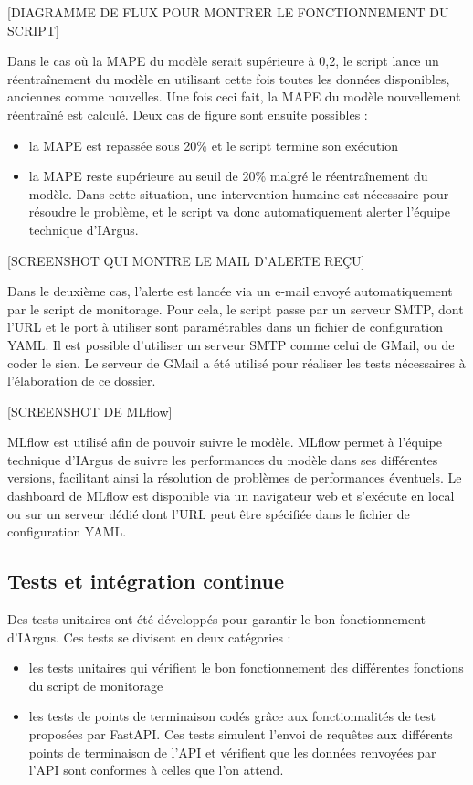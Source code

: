 \documentclass[french]{article}
\begin{document}
    [DIAGRAMME DE FLUX POUR MONTRER LE FONCTIONNEMENT DU SCRIPT]

    Dans le cas où la MAPE du modèle serait supérieure à 0,2, le script lance un réentraînement du modèle en utilisant cette fois toutes les données disponibles, anciennes comme nouvelles. Une fois ceci fait, la MAPE du modèle nouvellement réentraîné est calculé. Deux cas de figure sont ensuite possibles :
    \begin{itemize}
        \item la MAPE est repassée sous 20\% et le script termine son exécution
        \item la MAPE reste supérieure au seuil de 20\% malgré le réentraînement du modèle. Dans cette situation, une intervention humaine est nécessaire pour résoudre le problème, et le script va donc automatiquement alerter l'équipe technique d'IArgus.
    \end{itemize}

    [SCREENSHOT QUI MONTRE LE MAIL D'ALERTE REÇU]

    Dans le deuxième cas, l'alerte est lancée via un e-mail envoyé automatiquement par le script de monitorage. Pour cela, le script passe par un serveur SMTP, dont l'URL et le port à utiliser sont paramétrables dans un fichier de configuration YAML. Il est possible d'utiliser un serveur SMTP comme celui de GMail, ou de coder le sien. Le serveur de GMail a été utilisé pour réaliser les tests nécessaires à l'élaboration de ce dossier.

    [SCREENSHOT DE MLflow]

    MLflow est utilisé afin de pouvoir suivre le modèle. MLflow permet à l'équipe technique d'IArgus de suivre les performances du modèle dans ses différentes versions, facilitant ainsi la résolution de problèmes de performances éventuels. Le dashboard de MLflow est disponible via un navigateur web et s'exécute en local ou sur un serveur dédié dont l'URL peut être spécifiée dans le fichier de configuration YAML.
    

    \subsection{Tests et intégration continue}

    Des tests unitaires ont été développés pour garantir le bon fonctionnement d'IArgus. Ces tests se divisent en deux catégories :
    \begin{itemize}
        \item les tests unitaires qui vérifient le bon fonctionnement des différentes fonctions du script de monitorage
        \item les tests de points de terminaison codés grâce aux fonctionnalités de test proposées par FastAPI. Ces tests simulent l'envoi de requêtes aux différents points de terminaison de l'API et vérifient que les données renvoyées par l'API sont conformes à celles que l'on attend.
    \end{itemize}
\end{document}
